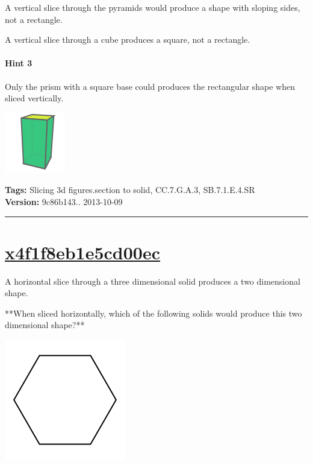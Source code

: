\documentclass[twocolumn,10pt]{article}
\def\shrinkfactor{0.4}
\begin{document}
A vertical slice through the pyramids would produce a shape with sloping sides, not a rectangle.

A vertical slice through a cube produces a square, not a rectangle.

\paragraph{Hint 3}Only the prism with a square base could produces the rectangular shape when sliced vertically.


\includegraphics[scale=\shrinkfactor]{figures/2ebec88f0b30eab2455be53549a16e7fc9469bd3.png}



\medskip
\noindent
\textbf{Tags:} {\footnotesize Slicing 3d figures.section to solid, CC.7.G.A.3, SB.7.1.E.4.SR}\\
\textbf{Version:} 9c86b143.. 2013-10-09
\smallskip\hrule





\section{\href{https://www.khanacademy.org/devadmin/content/items/x4f1f8eb1e5cd00ec}{x4f1f8eb1e5cd00ec}}

\noindent
A horizontal slice through a three dimensional solid produces a two dimensional shape.

**When sliced horizontally, which of the following solids would produce this two dimensional shape?**   

\includegraphics[scale=\shrinkfactor]{figures/c3a4fe85ac002ccb07495385394da51d1dcff923.png} 
\end{document}
